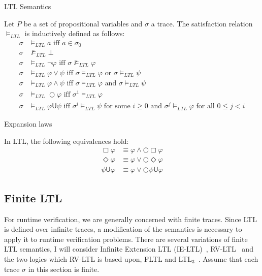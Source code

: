 \documentclass[a4paper]{article}
\newcommand{\U}{\mathsf{U}}
\newcommand{\tand}{\text{ and }}
\newcommand{\tor}{\text{ or }}
\newcommand{\tiff}{\text{ iff }}
\newcommand{\fsome}{\text{ for some }}
\newcommand{\fall}{\text{ for all }}
\begin{document}
\begin{defn}{LTL Semantics}\label{ltlsem}

  Let $P$ be a set of propositional variables and $\sigma$ a trace. The satisfaction relation $\vDash_{LTL}$ is inductively defined as follows:
\begin{align*}
  \sigma &\vDash_{LTL} a \tiff a \in \sigma_0\\
  \sigma &\nvDash_{LTL} \bot\\
  \sigma &\vDash_{LTL} \neg \varphi \tiff \sigma \nvDash_{LTL} \varphi\\
  \sigma &\vDash_{LTL} \varphi \lor \psi \tiff \sigma \vDash_{LTL} \varphi \tor \sigma \vDash_{LTL} \psi\\
  \sigma &\vDash_{LTL} \varphi \land \psi \tiff \sigma \vDash_{LTL} \varphi \tand \sigma \vDash_{LTL} \psi\\
  \sigma &\vDash_{LTL} \bigcirc \varphi \tiff \sigma^1 \vDash_{LTL} \varphi\\
  \sigma &\vDash_{LTL} \varphi \U \psi \tiff \sigma^i \vDash_{LTL} \psi \fsome i \geq 0 \tand \sigma^j \vDash_{LTL} \varphi \fall 0 \leq j < i
\end{align*}

\end{defn}

\begin{lem}{Expansion laws}\label{ltlexp}

  In LTL, the following equivalences hold:
  \begin{align}
    \Box \varphi &\equiv \varphi \land \bigcirc \Box \varphi\label{elbox}\\
    \Diamond \varphi &\equiv \varphi \lor \bigcirc \Diamond \varphi\label{eldiamond}\\
    \psi \U \varphi &\equiv \varphi \lor \bigcirc \psi \U \varphi\label{elU}
  \end{align}

\end{lem}



\subsection{Finite LTL}
For runtime verification, we are generally concerned with finite traces. Since LTL is defined over infinite traces, a modification of the semantics is necessary to apply it to runtime verification problems. %
There are several variations of finite LTL semantics, I will consider Infinite Extension LTL (IE-LTL)~\autocite{rosu2005rewriting}, RV-LTL~\autocite{bauer2010comparing} and the two logics which RV-LTL is based upon, FLTL and LTL$_3$~\autocite{bauer2010comparing}.
Assume that each trace $\sigma$ in this section is finite.
\end{document}
